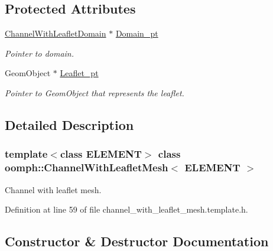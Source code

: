 \subsection*{Protected Attributes}
\begin{DoxyCompactItemize}
\item 
\hyperlink{classoomph_1_1ChannelWithLeafletDomain}{Channel\+With\+Leaflet\+Domain} $\ast$ \hyperlink{classoomph_1_1ChannelWithLeafletMesh_a20dc25dbf38222156f72b6d6213c5246}{Domain\+\_\+pt}
\begin{DoxyCompactList}\small\item\em Pointer to domain. \end{DoxyCompactList}\item 
Geom\+Object $\ast$ \hyperlink{classoomph_1_1ChannelWithLeafletMesh_ab0d744f2c35b9397dd35cc75a2db9e60}{Leaflet\+\_\+pt}
\begin{DoxyCompactList}\small\item\em Pointer to Geom\+Object that represents the leaflet. \end{DoxyCompactList}\end{DoxyCompactItemize}


\subsection{Detailed Description}
\subsubsection*{template$<$class E\+L\+E\+M\+E\+NT$>$\newline
class oomph\+::\+Channel\+With\+Leaflet\+Mesh$<$ E\+L\+E\+M\+E\+N\+T $>$}

Channel with leaflet mesh. 

Definition at line 59 of file channel\+\_\+with\+\_\+leaflet\+\_\+mesh.\+template.\+h.



\subsection{Constructor \& Destructor Documentation}
\mbox{\label{classoomph_1_1ChannelWithLeafletMesh_ab210be34e9d7f72af9aefee618d41f3d}} 
